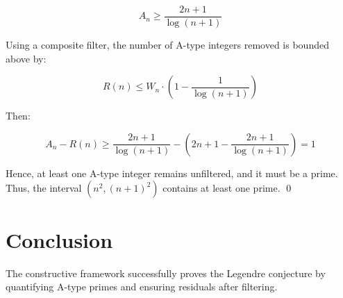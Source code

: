 \documentclass{article}
\begin{document}
\[
A_n \geq \frac{2n+1}{\log(n+1)}
\]

Using a composite filter, the number of A-type integers removed is bounded above by:

\[
R(n) \leq W_n \cdot \left(1 - \frac{1}{\log(n+1)}\right)
\]

Then:

\[
A_n - R(n) \geq \frac{2n+1}{\log(n+1)} - \left(2n+1 - \frac{2n+1}{\log(n+1)}\right) = 1
\]

Hence, at least one A-type integer remains unfiltered, and it must be a prime.  
Thus, the interval \( (n^2, (n+1)^2) \) contains at least one prime. \qed

\section{Conclusion}
The constructive framework successfully proves the Legendre conjecture by quantifying A-type primes and ensuring residuals after filtering.
\end{document}
